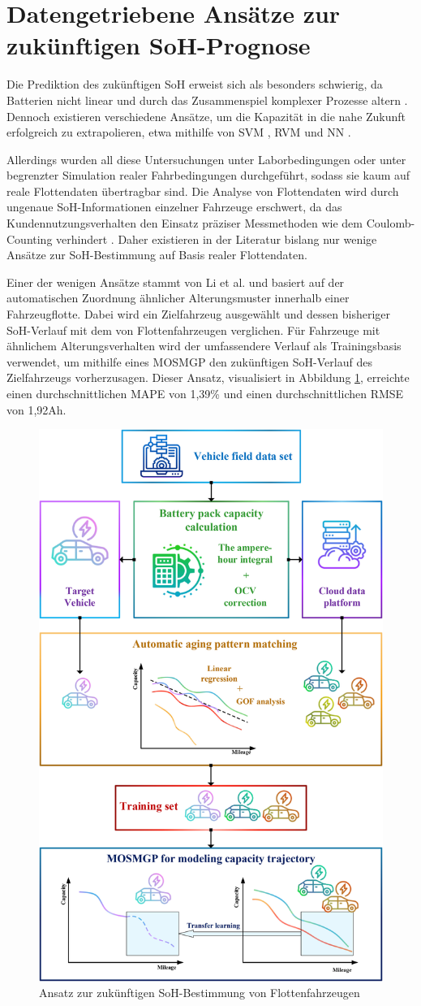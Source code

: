 \section{Datengetriebene Ansätze zur zukünftigen \acs{SoH}-Prognose}

Die Prediktion des zukünftigen \acs{SoH} erweist sich als besonders schwierig, da Batterien nicht linear und durch das Zusammenspiel komplexer Prozesse altern \cite{SOHComplexity}. Dennoch existieren verschiedene Ansätze, um die Kapazität in die nahe Zukunft erfolgreich zu extrapolieren, etwa mithilfe von \ac{SVM} \cite{urlSVM}, \ac{RVM} \cite{RVM} und \acs{NN} \cite{SOHNeuralNetworks}.
\par
Allerdings wurden all diese Untersuchungen unter Laborbedingungen oder unter begrenzter Simulation realer Fahrbedingungen durchgeführt, sodass sie kaum auf reale Flottendaten übertragbar sind. Die Analyse von Flottendaten wird durch ungenaue \acs{SoH}-Informationen einzelner Fahrzeuge erschwert, da das Kundennutzungsverhalten den Einsatz präziser Messmethoden wie dem Coulomb-Counting verhindert \cite{SOHCoulombCounting}. Daher existieren in der Literatur bislang nur wenige Ansätze zur \acs{SoH}-Bestimmung auf Basis realer Flottendaten.
\par
Einer der wenigen Ansätze stammt von Li et al. und basiert auf der automatischen Zuordnung ähnlicher Alterungsmuster innerhalb einer Fahrzeugflotte. Dabei wird ein Zielfahrzeug ausgewählt und dessen bisheriger SoH-Verlauf mit dem von Flottenfahrzeugen verglichen. Für Fahrzeuge mit ähnlichem Alterungsverhalten wird der umfassendere Verlauf als Trainingsbasis verwendet, um mithilfe eines \ac{MOSMGP} den zukünftigen \acs{SoH}-Verlauf des Zielfahrzeugs vorherzusagen. Dieser Ansatz, visualisiert in Abbildung \ref{fig:nn-vehicle-fleet-data}, erreichte einen durchschnittlichen \ac{MAPE} von 1,39\% und einen durchschnittlichen \ac{RMSE} von 1,92Ah.
\begin{figure}[H]
	\centering
	\includegraphics[height=1.0\linewidth]{resources/images/nn-vehicle-fleet-data}
	\caption{Ansatz zur zukünftigen \acs{SoH}-Bestimmung von Flottenfahrzeugen \cite{nnVehicleFleetData}}
	\label{fig:nn-vehicle-fleet-data}
\end{figure}